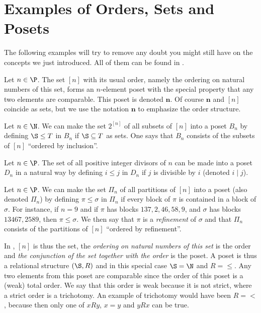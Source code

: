 \section{Examples of Orders, Sets and Posets}


The following examples will try to remove any doubt you might still have on the
concepts we just introduced. All of them can be found in
\citet*{Stanley:2011:ECV:2124415}.




\begin{example}
\label{ex:poset:def}

\item\label{ex:poset:def:a} Let $n \in \P$. The set $[n]$ with its usual order,
namely the ordering on natural numbers of this set, forms an $n$-element poset
with the special property that any two elements are comparable. This poset is
denoted $\bm{n}$. Of course $\bm{n}$ and $[n]$ coincide as sets, but we use the
notation $\bm{n}$ to emphasize the order structure.

\item\label{ex:poset:def:b} Let $n \in \N$. We can make the set $2^{[n]}$ of
all subsets of $[n]$ into a poset $B_n$ by defining $\S \leq T$ in $B_n$ if $\S
\subseteq T$ as sets. One says that $B_n$ consists of the subsets of $[n]$
``ordered by inclusion''.

\item\label{ex:poset:def:c}  Let $n \in \P$. The set of all positive integer
divisors of $n$ can be made into a poset $D_n$ in a natural way by defining $i
\leq j$ in $D_n$ if $j$ is divisible by $i$ (denoted $i \mid j$).

\item\label{ex:poset:def:d}  Let $n \in \P$. We can make the set $\Pi_n$ of all
partitions of $[n]$ into a poset (also denoted $\Pi_n$) by defining $\pi \leq
\sigma$ in $\Pi_n$ if every block of $\pi$ is contained in a block of $\sigma$.
For instance, if $n = 9$ and if $\pi$ has blocks $137, 2, 46, 58, 9$, and
$\sigma$ has blocks $13467, 2589$, then $\pi \leq \sigma$. We then say that
$\pi$ is a \emph{refinement} of $\sigma$ and that $\Pi_n$ consists of the
partitions of $[n]$ ``ordered by refinement''.
\end{example}


In , $[n]$ is thus the set, the \emph{ordering on natural
numbers of this set} is the order and \emph{the conjunction of the set together
with the order} is the poset. A poset is thus a relational structure $(\S, R)$
and in this special case $\S = \N$ and $R = \le$. Any two elements from this
poset are comparable since the order of this poset is a (weak) total order. We
say that this order is weak because it is not strict, where a strict order is a
trichotomy. An example of trichotomy would have been $R = <$, because then only
one of $x R y$, $x = y$ and $y R x$ can be true.


